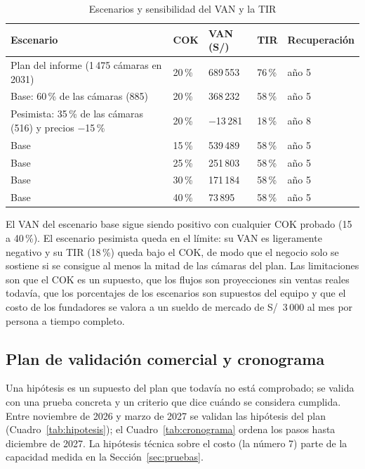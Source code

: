 \documentclass[12pt,a4paper]{article}
\begin{document}
\begin{table}[H]
\caption{Escenarios y sensibilidad del VAN y la TIR}
\label{tab:van-sens}
\centering
\footnotesize
\renewcommand{\arraystretch}{1.12}
\begin{tabular}{|L{0.34\textwidth}|R{0.08\textwidth}|R{0.15\textwidth}|R{0.10\textwidth}|R{0.15\textwidth}|}
\hline
\textbf{Escenario} & \textbf{COK} & \textbf{VAN (S/)} & \textbf{TIR} & \textbf{Recuperación} \\
\hline
Plan del informe (1\,475 cámaras en 2031) & 20\,\% & 689\,553 & 76\,\% & año 5 \\
\hline
Base: 60\,\% de las cámaras (885) & 20\,\% & 368\,232 & 58\,\% & año 5 \\
\hline
Pesimista: 35\,\% de las cámaras (516) y precios $-$15\,\% & 20\,\% & $-$13\,281 & 18\,\% & año 8 \\
\hline
Base & 15\,\% & 539\,489 & 58\,\% & año 5 \\
\hline
Base & 25\,\% & 251\,803 & 58\,\% & año 5 \\
\hline
Base & 30\,\% & 171\,184 & 58\,\% & año 5 \\
\hline
Base & 40\,\% & 73\,895 & 58\,\% & año 5 \\
\hline
\end{tabular}
\end{table}

El VAN del escenario base sigue siendo positivo con cualquier COK probado (15 a
40\,\%). El escenario pesimista queda en el límite: su VAN es ligeramente
negativo y su TIR (18\,\%) queda bajo el COK, de modo que el negocio solo se
sostiene si se consigue al menos la mitad de las cámaras del plan. Las
limitaciones son que el COK es un supuesto, que los flujos son proyecciones sin
ventas reales todavía, que los porcentajes de los escenarios son supuestos del
equipo y que el costo de los fundadores se valora a un sueldo de mercado de
S/~3\,000 al mes por persona a tiempo completo.

\subsection{Plan de validación comercial y cronograma}

Una hipótesis es un supuesto del plan que todavía no está comprobado; se
valida con una prueba concreta y un criterio que dice cuándo se considera
cumplida. Entre noviembre de 2026 y marzo de 2027 se validan las hipótesis del
plan
(Cuadro~\ref{tab:hipotesis}); el Cuadro~\ref{tab:cronograma} ordena los pasos
hasta diciembre de 2027. La hipótesis técnica sobre el costo (la número 7)
parte de la capacidad medida en la Sección~\ref{sec:pruebas}.
\end{document}
